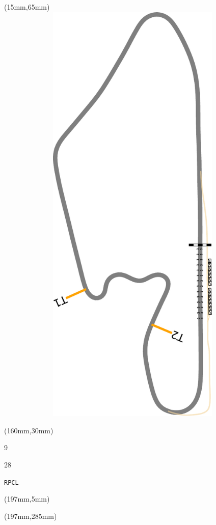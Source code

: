 \begin{textblock*}{185mm}(15mm,65mm)%
\centering
\mbox{\includegraphics[width=185mm,height=210mm,keepaspectratio]{PT/RPCL.pdf}}
\end{textblock*}
\begin{textblock*}{40mm}(160mm,30mm)%
\Large
\par{} 
\par9 
\par28 
\par\hfill\tiny\tt RPCL\\
\end{textblock*}
\begin{textblock*}{20mm}(197mm,5mm)%
\fbox{\thepage}
\label{RPCL}
\end{textblock*}
\begin{textblock*}{20mm}(197mm,285mm)%
\fbox{\thepage}
\end{textblock*}

